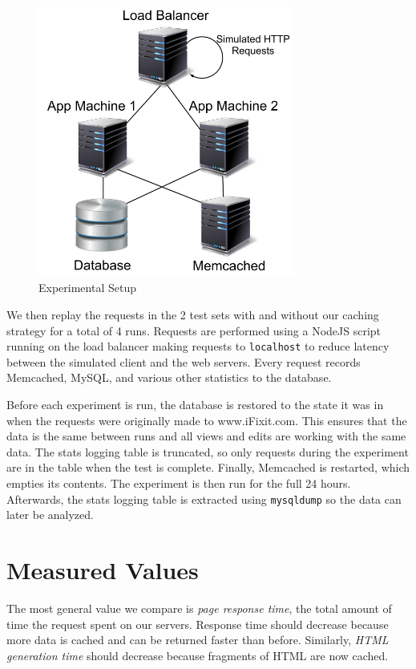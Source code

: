 \documentclass[12pt]{ucthesis}
\begin{document}
\begin{figure}[h]
\centering
\includegraphics[width=0.75\textwidth]{assets/experimentalArchitecture.png}
\caption{Experimental Setup}
\label{fig:experimentalArchitecture}
\end{figure}

We then replay the requests in the 2 test sets with and without our caching strategy for a total of 4 runs.
Requests are performed using a NodeJS script running on the load balancer making requests to {\tt localhost} to reduce latency between the simulated client and the web servers.
Every request records \textsf{Memcached}, \textsf{MySQL}, and various other statistics to the database.

Before each experiment is run, the database is restored to the state it was in when the requests were originally made to \textsf{www.iFixit.com}.
This ensures that the data is the same between runs and all views and edits are working with the same data.
The stats logging table is truncated, so only requests during the experiment are in the table when the test is complete.
Finally, \textsf{Memcached} is restarted, which empties its contents.
The experiment is then run for the full 24 hours.
Afterwards, the stats logging table is extracted using {\tt mysqldump} so the data can later be analyzed.

\section{Measured Values}
The most general value we compare is \textit{page response time}, the total amount of time the request spent on our servers.
Response time should decrease because more data is cached and can be returned faster than before.
Similarly, \textit{HTML generation time} should decrease because fragments of HTML are now cached.
\end{document}
